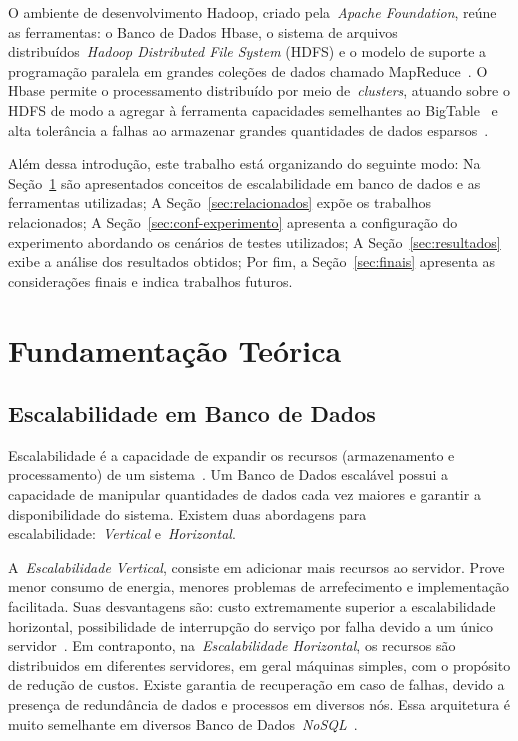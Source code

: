 \documentclass[12pt]{article}
\begin{document}
O ambiente de desenvolvimento Hadoop, criado pela~\emph{Apache Foundation}, reúne as ferramentas: o Banco de Dados Hbase, o sistema de arquivos distribuídos~\emph{Hadoop Distributed File System} (HDFS) e o modelo de suporte a programação paralela em grandes coleções de dados chamado MapReduce~\cite{hadoophbase}. O Hbase permite o processamento distribuído por meio de~\emph{clusters}, atuando sobre o HDFS de modo a agregar à ferramenta capacidades semelhantes ao BigTable~\cite{chang2008bigtable} e alta tolerância a falhas ao armazenar grandes quantidades de dados esparsos~\cite{hadoophbase}.

Além dessa introdução, este trabalho está organizando do seguinte modo: Na Seção~\ref{sec:fundamentacao} são apresentados conceitos de escalabilidade em banco de dados e as ferramentas utilizadas; A Seção~\ref{sec:relacionados} expõe os trabalhos relacionados; A Seção~\ref{sec:conf-experimento} apresenta a configuração do experimento abordando os cenários de testes utilizados; A Seção~\ref{sec:resultados} exibe a análise dos resultados obtidos; Por fim, a Seção~\ref{sec:finais} apresenta as considerações finais e indica trabalhos futuros.

\section{Fundamentação Teórica}
\label{sec:fundamentacao}

\subsection{Escalabilidade em Banco de Dados}
\label{subsec:escalabilidade}

Escalabilidade é a capacidade de expandir os recursos (armazenamento e processamento) de um sistema~\cite{elmasri2010fundamentals}. Um Banco de Dados escalável possui a capacidade de manipular quantidades de dados cada vez maiores e garantir a disponibilidade do sistema. Existem duas abordagens para escalabilidade:~\emph{Vertical} e~\emph{Horizontal}.

A~\emph{Escalabilidade Vertical}, consiste em adicionar mais recursos ao servidor. Prove menor consumo de energia, menores problemas de arrefecimento e implementação facilitada. Suas desvantagens são: custo extremamente superior a escalabilidade horizontal, possibilidade de interrupção do serviço por falha devido a um único servidor~\cite{hwang2014scale}. Em contraponto, na~\emph{Escalabilidade Horizontal}, os recursos são distribuidos em diferentes servidores, em geral máquinas simples, com o propósito de redução de custos. Existe garantia de recuperação em caso de falhas, devido a presença de redundância de dados e processos em diversos nós. Essa arquitetura é muito semelhante em diversos Banco de Dados~\textit{NoSQL}~\cite{hwang2014scale}.
\end{document}
